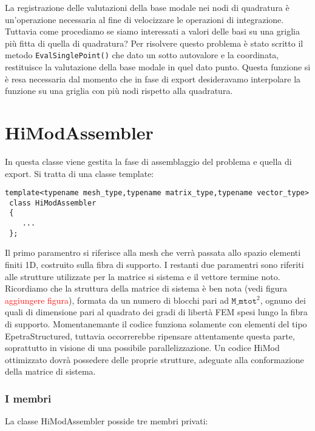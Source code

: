 La registrazione delle valutazioni della base modale nei nodi di quadratura \`e un'operazione necessaria al fine di velocizzare le operazioni di integrazione. Tuttavia come procediamo se siamo interessati a valori delle basi su una griglia pi\`u fitta di quella di quadratura? Per risolvere questo problema \`e stato scritto il metodo \texttt{EvalSinglePoint()} che dato un sotto autovalore e la coordinata, restituisce la valutazione della base modale in quel dato punto. Questa funzione si \`e resa necessaria dal momento che in fase di export desideravamo interpolare la funzione su una griglia con pi\`u nodi rispetto alla quadratura.

\section{HiModAssembler}
 
 In questa classe viene gestita la fase di assemblaggio del problema e quella di export. Si tratta di una classe template:
 \begin{lstlisting}[style = general]
 template<typename mesh_type,typename matrix_type,typename vector_type>
 class HiModAssembler
 {
	... 
 };
 \end{lstlisting}
 Il primo paramentro si riferisce alla mesh che verr\`a passata allo spazio elementi finiti 1D, costruito sulla fibra di supporto. I restanti due paramentri sono riferiti alle strutture utilizzate per la matrice si sistema e il vettore termine noto. Ricordiamo che la struttura della matrice di sistema \`e ben nota (vedi figura \textcolor{red}{aggiungere figura}), formata da un numero di blocchi pari ad $\texttt{M\_mtot}^2$, ognuno dei quali di dimensione pari al quadrato dei gradi di libert\`a FEM spesi lungo la fibra di supporto.
 Momentanemante il codice funziona solamente con elementi del tipo EpetraStructured, tuttavia occorrerebbe ripensare attentamente questa parte, soprattutto in visione di una possibile parallelizzazione.
Un codice HiMod ottimizzato dovr\`a possedere delle proprie strutture, adeguate alla conformazione della matrice di sistema.

\subsubsection{I membri}
La classe HiModAssembler posside tre membri privati:


